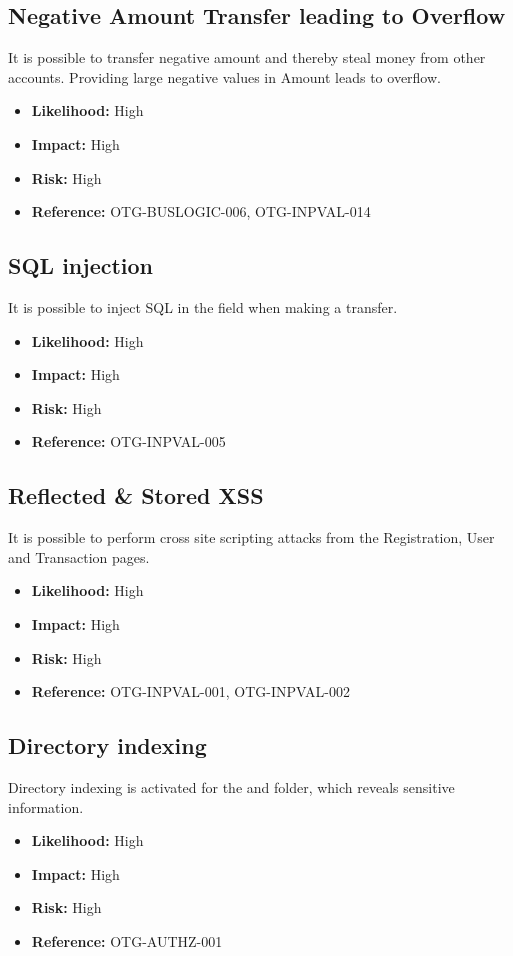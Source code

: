 \subsection{Negative Amount Transfer leading to Overflow}
It is possible to transfer negative amount and thereby steal money from other accounts.
Providing large negative values in Amount leads to overflow.
\begin{itemize}
	\item \textbf{Likelihood:} High
	\item \textbf{Impact:} High
	\item \textbf{Risk:} High
	\item \textbf{Reference:} OTG-BUSLOGIC-006, OTG-INPVAL-014
\end{itemize}

\subsection{SQL injection}
It is possible to inject SQL in the field  when making a transfer.
\begin{itemize}
	\item \textbf{Likelihood:} High
	\item \textbf{Impact:} High
	\item \textbf{Risk:} High
	\item \textbf{Reference:} OTG-INPVAL-005
\end{itemize}

\subsection{Reflected \& Stored XSS}
It is possible to perform cross site scripting attacks from the Registration, User and Transaction pages.
\begin{itemize}
	\item \textbf{Likelihood:} High
	\item \textbf{Impact:} High
	\item \textbf{Risk:} High
	\item \textbf{Reference:} OTG-INPVAL-001, OTG-INPVAL-002
\end{itemize}

\subsection{Directory indexing}
Directory indexing is activated for the  and  folder, which reveals sensitive information.
\begin{itemize}
	\item \textbf{Likelihood:} High
	\item \textbf{Impact:} High
	\item \textbf{Risk:} High
	\item \textbf{Reference:} OTG-AUTHZ-001
\end{itemize}

